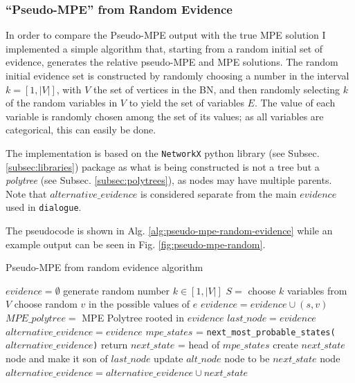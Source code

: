 \subsubsection{\enquote{Pseudo-MPE} from Random Evidence} \label{subsubsec: pseudo-mpe-random}
In order to compare the Pseudo-MPE output with the true MPE solution I implemented a simple algorithm that, starting from a random initial set of evidence, generates the relative pseudo-MPE and MPE solutions.
The random initial evidence set is constructed by randomly choosing a number in the interval $k = [ 1, |V| ]$, with $V$ the set of vertices in the BN, and then randomly selecting $k$ of the random variables in $V$ to yield the set of variables $E$.
The value of each variable is randomly chosen among the set of its values; as all variables are categorical, this can easily be done.

The implementation is based on the \texttt{NetworkX} python library (see Subsec. \ref{subsec:libraries}) package as what is being constructed is not a tree but a \textit{polytree} (see Subsec. \ref{subsec:polytrees}), as nodes may have multiple parents.
Note that $alternative\_evidence$ is considered separate from the main $evidence$ used in \texttt{dialogue}.

The pseudocode is shown in Alg. \ref{alg:pseudo-mpe-random-evidence} while an example output can be seen in Fig. \ref{fig:pseudo-mpe-random}.

\begin{algorithm}[htp!]
	\caption{Pseudo-MPE from random evidence algorithm}
	\label{alg:pseudo-mpe-random-evidence}
	\begin{algorithmic}[1]
		\State $evidence = \emptyset$
		\State generate random number $k \in [ 1, |V| ]$
		\State $S = $ choose $k$ variables from $V$
			\State choose random $v$ in the possible values of $e$ 
			\State $evidence = evidence \cup (s,v)$
		\EndFor
		\State $MPE\_polytree = $ MPE Polytree rooted in $evidence$
		\State $last\_node = evidence$
		\State $alternative\_evidence = evidence$ 
			\State $mpe\_states$ = \texttt{next\_most\_probable\_states($alternative\_evidence$)}
				\State return
			\Else
				\State $next\_state$ = head of $mpe\_states$ 
				\State create $next\_state$ node and make it son of $last\_node$
				\State update $alt\_node$ node to be $next\_state$ node
				\State $alternative\_evidence = alternative\_evidence \cup next\_state$
			\EndIf
		\EndWhile
	\end{algorithmic}
\end{algorithm}


